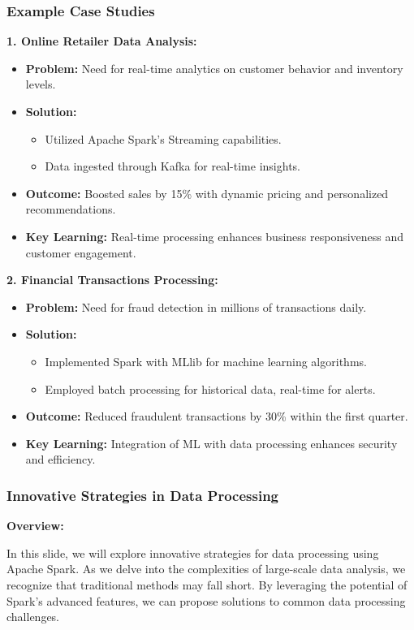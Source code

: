 \documentclass[aspectratio=169]{beamer}
\begin{document}
\begin{frame}[fragile]
    \frametitle{Example Case Studies}
    
    \textbf{1. Online Retailer Data Analysis:} 
    \begin{itemize}
        \item \textbf{Problem:} Need for real-time analytics on customer behavior and inventory levels.
        \item \textbf{Solution:}
        \begin{itemize}
            \item Utilized Apache Spark's Streaming capabilities.
            \item Data ingested through Kafka for real-time insights.
        \end{itemize}
        \item \textbf{Outcome:} Boosted sales by 15\% with dynamic pricing and personalized recommendations.
        \item \textbf{Key Learning:} Real-time processing enhances business responsiveness and customer engagement.
    \end{itemize}

    \textbf{2. Financial Transactions Processing:} 
    \begin{itemize}
        \item \textbf{Problem:} Need for fraud detection in millions of transactions daily.
        \item \textbf{Solution:}
        \begin{itemize}
            \item Implemented Spark with MLlib for machine learning algorithms.
            \item Employed batch processing for historical data, real-time for alerts.
        \end{itemize}
        \item \textbf{Outcome:} Reduced fraudulent transactions by 30\% within the first quarter.
        \item \textbf{Key Learning:} Integration of ML with data processing enhances security and efficiency.
    \end{itemize}
\end{frame}

\begin{frame}
    \frametitle{Innovative Strategies in Data Processing}
    \textbf{Overview:}
    
    In this slide, we will explore innovative strategies for data processing using Apache Spark. As we delve into the complexities of large-scale data analysis, we recognize that traditional methods may fall short. By leveraging the potential of Spark's advanced features, we can propose solutions to common data processing challenges.
\end{frame}
\end{document}

